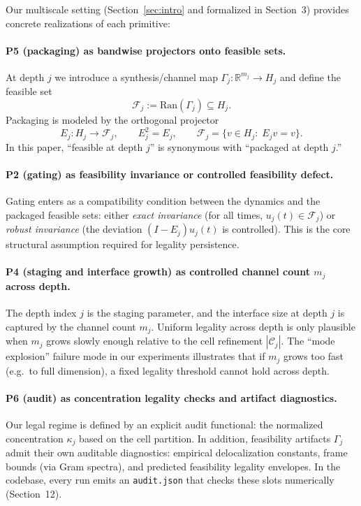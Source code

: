 \documentclass[11pt]{article}
\begin{document}
Our multiscale setting (Section~\ref{sec:intro} and formalized in Section~3) provides concrete realizations of each primitive:

\paragraph{P5 (packaging) as bandwise projectors onto feasible sets.}
At depth $j$ we introduce a synthesis/channel map $\Gamma_j:\mathbb{R}^{m_j}\to H_j$ and define the feasible set
\[
\mathcal{F}_j := \mathrm{Ran}(\Gamma_j)\subseteq H_j.
\]
Packaging is modeled by the orthogonal projector
\[
E_j: H_j \to \mathcal{F}_j,
\qquad E_j^2 = E_j,
\qquad \mathcal{F}_j = \{v\in H_j:\;E_j v = v\}.
\]
In this paper, ``feasible at depth $j$'' is synonymous with ``packaged at depth $j$.''

\paragraph{P2 (gating) as feasibility invariance or controlled feasibility defect.}
Gating enters as a compatibility condition between the dynamics and the packaged feasible sets:
either \emph{exact invariance} (for all times, $u_j(t)\in\mathcal{F}_j$) or \emph{robust invariance} (the deviation $(I-E_j)u_j(t)$ is controlled).
This is the core structural assumption required for legality persistence.

\paragraph{P4 (staging and interface growth) as controlled channel count $m_j$ across depth.}
The depth index $j$ is the staging parameter, and the interface size at depth $j$ is captured by the channel count $m_j$.
Uniform legality across depth is only plausible when $m_j$ grows slowly enough relative to the cell refinement $|\mathcal{C}_j|$.
The ``mode explosion'' failure mode in our experiments illustrates that if $m_j$ grows too fast (e.g.\ to full dimension), a fixed legality threshold cannot hold across depth.

\paragraph{P6 (audit) as concentration legality checks and artifact diagnostics.}
Our legal regime is defined by an explicit audit functional: the normalized concentration $\kappa_j$ based on the cell partition.
In addition, feasibility artifacts $\Gamma_j$ admit their own auditable diagnostics: empirical delocalization constants, frame bounds (via Gram spectra), and predicted feasibility legality envelopes.
In the codebase, every run emits an \texttt{audit.json} that checks these slots numerically (Section~12).
\end{document}
